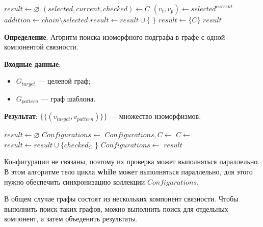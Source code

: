 \begin{algorithmic}
\State $result \gets \varnothing$
\State $(selected, current, checked) \gets C$
\State $(v_t, v_p) \gets selected^{current}$
    \State $addition \gets chain \setminus selected$
        \State $result \gets result \cup \{ $  $ \}$
    \EndIf
\EndFor
{}
    \State $result \gets \{ C \}$
\EndIf
\State \Return $result$
\EndFunction
\end{algorithmic}

\textbf{Определение}. Агоритм поиска изоморфного подграфа в графе с одной компонентой связности.

\textbf{Входные данные}:
\begin{itemize}
\item $G_{target}$ --- целевой граф;
\item $G_{pattern}$ --- граф шаблона.
\end{itemize}

\textbf{Результат}: $\{ \{ ( v_{target}, v_{pattern} ) \} \}$ --- множество
изоморфизмов.

\begin{algorithmic}
    \State $result \gets \varnothing$
    \State $Configurations \gets$ 
        \State $Configurations, C \gets$ 
        \State $C \gets$ 
                \State $result \gets result \cup \{ checked_C$ \}
            \EndIf
        \Else
            \State $Configurations \gets$ 
        \EndIf
    \EndWhile
    \State \Return $result$
\EndFunction
\end{algorithmic}

Конфигурации не связаны, поэтому их проверка может выполняться параллельно.
В этом алгоритме тело цикла \textbf{while} может выполняться параллельно,
для этого нужно обеспечить синхронизацию коллекции $Configurations$.

В общем случае графы состоят из нескольких компонент связности.
Чтобы выполнить поиск таких графов, можно выполнить поиск для отдельных компонент,
а затем объеденить результаты.

